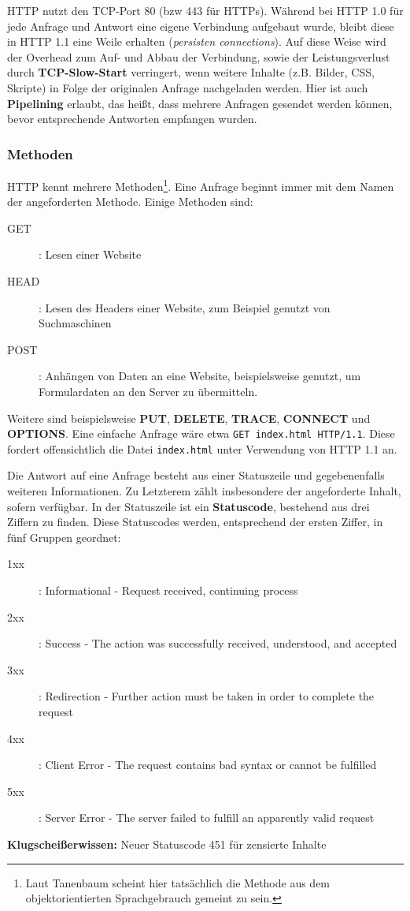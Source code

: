 \documentclass{article} %
\begin{document}
HTTP nutzt den TCP-Port 80 (bzw 443 für HTTPs).
Während bei HTTP 1.0 für jede Anfrage und Antwort eine eigene Verbindung aufgebaut wurde, bleibt diese in HTTP 1.1 eine Weile erhalten (\emph{persisten connections}).
Auf diese Weise wird der Overhead zum Auf- und Abbau der Verbindung, sowie der Leistungsverlust durch \textbf{TCP-Slow-Start} verringert, wenn weitere Inhalte (z.B. Bilder, CSS, Skripte) in Folge der originalen Anfrage nachgeladen werden.
Hier ist auch \textbf{Pipelining} erlaubt, das heißt, dass mehrere Anfragen gesendet werden können, bevor entsprechende Antworten empfangen wurden.

\subsubsection{Methoden}

HTTP kennt mehrere Methoden\footnote{Laut Tanenbaum\cite{tanenbaum2003computer} scheint hier tatsächlich die Methode aus dem objektorientierten Sprachgebrauch gemeint zu sein.}.
Eine Anfrage beginnt immer mit dem Namen der angeforderten Methode.
Einige Methoden sind:
\begin{description}
	\item[GET]: Lesen einer Website
	\item[HEAD]: Lesen des Headers einer Website, zum Beispiel genutzt von Suchmaschinen
	\item[POST]: Anhängen von Daten an eine Website, beispielsweise genutzt, um Formulardaten an den Server zu übermitteln.
\end{description}
Weitere sind beispielsweise \textbf{PUT}, \textbf{DELETE}, \textbf{TRACE}, \textbf{CONNECT} und \textbf{OPTIONS}.
Eine einfache Anfrage wäre etwa \texttt{GET index.html HTTP/1.1}.
Diese fordert offensichtlich die Datei \texttt{index.html} unter Verwendung von HTTP 1.1 an.

Die Antwort auf eine Anfrage besteht aus einer Statuszeile und gegebenenfalls weiteren Informationen.
Zu Letzterem zählt insbesondere der angeforderte Inhalt, sofern verfügbar.
In der Statuszeile ist ein \textbf{Statuscode}, bestehend aus drei Ziffern zu finden.
Diese Statuscodes werden, entsprechend der ersten Ziffer, in fünf Gruppen geordnet:
\begin{description}
	\item[1xx]: Informational - Request received, continuing process
	\item[2xx]: Success - The action was successfully received, understood, and accepted
	\item[3xx]: Redirection - Further action must be taken in order to complete the request
	\item[4xx]: Client Error - The request contains bad syntax or cannot be fulfilled
	\item[5xx]: Server Error - The server failed to fulfill an apparently valid request
\end{description}
\textbf{Klugscheißerwissen:} Neuer Statuscode 451 für zensierte Inhalte\cite{http451rfcDraft, sokolov2015http451}
\end{document}
